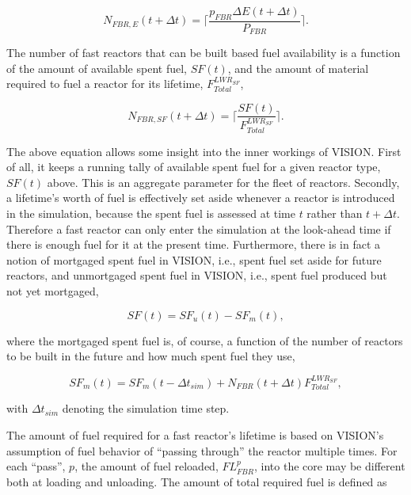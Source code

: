 \begin{equation}
N_{FBR,E}\left(t+\Delta t\right) = 
                        \lceil \frac{p_{FBR} \Delta E (t + \Delta t)}
                                    {P_{FBR}} \rceil .
\end{equation}

The number of fast reactors that can be built based fuel availability is a
function of the amount of available spent fuel, $SF(t)$, and the amount
of material required to fuel a reactor for its lifetime, $F^{LWR_{SF}}_{Total}$,

\begin{equation}
N_{FBR,SF}\left(t+\Delta t\right) = 
                        \lceil \frac{SF(t)}
                                    {F^{LWR_{SF}}_{Total}} \rceil .
\end{equation}

The above equation allows some insight into the inner workings of VISION. First
of all, it keeps a running tally of available spent fuel for a given reactor
type, $SF(t)$ above. This is an aggregate parameter for the fleet of
reactors. Secondly, a lifetime's worth of fuel is effectively set aside whenever
a reactor is introduced in the simulation, because the spent fuel is assessed at
time $t$ rather than $t + \Delta t$. Therefore a fast reactor can only enter the
simulation at the look-ahead time if there is enough fuel for it at the present
time. Furthermore, there is in fact a notion of mortgaged spent fuel in VISION,
i.e., spent fuel set aside for future reactors, and unmortgaged spent fuel in
VISION, i.e., spent fuel produced but not yet mortgaged,

\begin{equation}
SF(t) = SF_u(t) - SF_m(t),
\end{equation}

where the mortgaged spent fuel is, of course, a function of the number of
reactors to be built in the future and how much spent fuel they use,

\begin{equation}
SF_m(t) = SF_m(t - \Delta t_{sim}) + N_{FBR}(t + \Delta t) F^{LWR_{SF}}_{Total},
\end{equation}

with $\Delta t_{sim}$ denoting the simulation time step.

The amount of fuel required for a fast reactor's lifetime is based on VISION's
assumption of fuel behavior of ``passing through'' the reactor multiple
times. For each ``pass'', $p$, the amount of fuel reloaded, $FL^p_{FBR}$, into
the core may be different both at loading and unloading. The amount of total
required fuel is defined as

